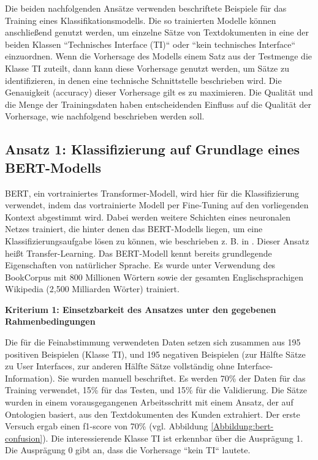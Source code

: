 Die beiden nachfolgenden Ansätze verwenden beschriftete Beispiele für das Training eines Klassifikationsmodells. Die so trainierten Modelle können anschließend genutzt werden, um einzelne Sätze von Textdokumenten in eine der beiden Klassen ``Technisches Interface (TI)`` oder ``kein technisches Interface`` einzuordnen. Wenn die Vorhersage des Modells einem Satz aus der Testmenge die Klasse TI zuteilt, dann kann diese Vorhersage genutzt werden, um Sätze zu identifizieren, in denen eine technische Schnittstelle beschrieben wird. Die Genauigkeit (accuracy) dieser Vorhersage gilt es zu maximieren. Die Qualität und die Menge der Trainingsdaten haben entscheidenden Einfluss auf die Qualität der Vorhersage, wie nachfolgend beschrieben werden soll.

\subsection{Ansatz 1: Klassifizierung auf Grundlage eines BERT-Modells}

BERT, ein vortrainiertes Transformer-Modell, wird hier für die Klassifizierung verwendet, indem das vortrainierte Modell per Fine-Tuning auf den vorliegenden Kontext abgestimmt wird. Dabei werden weitere Schichten eines neuronalen Netzes trainiert, die hinter denen das BERT-Modells liegen, um eine Klassifizierungsaufgabe lösen zu können, wie beschrieben z. B. in \cite[S. 2]{Tang}. Dieser Ansatz heißt Transfer-Learning. Das BERT-Modell kennt bereits grundlegende Eigenschaften von natürlicher Sprache. Es wurde unter Verwendung des BookCorpus mit 800 Millionen Wörtern sowie der gesamten Englischsprachigen Wikipedia (2,500 Milliarden Wörter) \cite{devlin} trainiert.

{\bf Kriterium 1: Einsetzbarkeit des Ansatzes unter den gegebenen Rahmenbedingungen}

Die für die Feinabstimmung verwendeten Daten setzen sich zusammen aus 195 positiven Beispielen (Klasse TI), und 195 negativen Beispielen (zur Hälfte Sätze zu User Interfaces, zur anderen Hälfte Sätze vollständig ohne Interface-Information). Sie wurden manuell beschriftet. Es werden 70\% der Daten für das Training verwendet, 15\% für das Testen, und 15\% für die Validierung. Die Sätze wurden in einem vorausgegangenen Arbeitsschritt mit einem Ansatz, der auf Ontologien basiert, aus den Textdokumenten des Kunden extrahiert. Der erste Versuch ergab einen f1-score von 70\% (vgl. Abbildung \ref{Abbildung:bert-confusion}). Die interessierende Klasse TI ist erkennbar über die Ausprägung 1. Die Ausprägung 0 gibt an, dass die Vorhersage ``kein TI`` lautete. 
 
